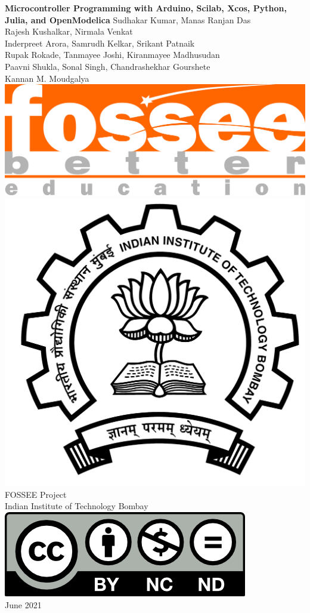 \begin{center}
    {\bf {\Huge Microcontroller Programming with Arduino, Scilab, Xcos,
            Python, Julia, and OpenModelica}}
    \vfill
    Sudhakar Kumar, Manas Ranjan Das \\
    Rajesh Kushalkar, Nirmala Venkat \\
    Inderpreet Arora, Samrudh Kelkar, Srikant Patnaik \\
    Rupak Rokade, Tanmayee Joshi, Kiranmayee Madhusudan \\
    Paavni Shukla, Sonal Singh, Chandrashekhar Gourshete \\
    Kannan M. Moudgalya \\
    \vfill
    \includegraphics[width=0.3\linewidth]{suppl/fossee_logo_hi.png} \quad
    \includegraphics[width=0.2\linewidth]{suppl/IITB-logo-HighRes.png} \\
    FOSSEE Project \\
    Indian Institute of Technology Bombay \\ [2mm]
    \includegraphics[width=0.15\linewidth]{suppl/by-nc-nd.png} \\ [1mm]
    June 2021
\end{center}

\clearpage
